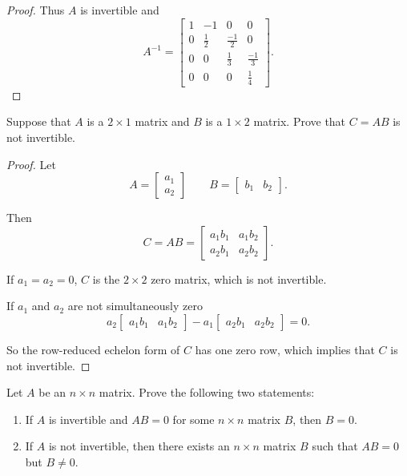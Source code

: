 \begin{proof}
    Thus $A$ is invertible and
    \[
        A^{-1} =
        \begin{bmatrix}
            1 & -1          & 0            & 0            \\
            0 & \frac{1}{2} & \frac{-1}{2} & 0            \\
            0 & 0           & \frac{1}{3}  & \frac{-1}{3} \\
            0 & 0           & 0            & \frac{1}{4}
        \end{bmatrix}.
    \]
\end{proof}

\begin{exercise}
    Suppose that $A$ is a $2\times 1$ matrix and $B$ is a $1\times 2$ matrix. Prove that $C = AB$ is not invertible.
\end{exercise}

\begin{proof}
    Let
    \[
        A = \begin{bmatrix}
            a_{1} \\
            a_{2}
        \end{bmatrix}
        \qquad
        B = \begin{bmatrix}
            b_{1} & b_{2}
        \end{bmatrix}.
    \]

    Then
    \[
        C = AB = \begin{bmatrix}
            a_{1}b_{1} & a_{1}b_{2} \\
            a_{2}b_{1} & a_{2}b_{2}
        \end{bmatrix}.
    \]

    If $a_{1} = a_{2} = 0$, $C$ is the $2\times 2$ zero matrix, which is not invertible.

    If $a_{1}$ and $a_{2}$ are not simultaneously zero
    \[
        a_{2}\begin{bmatrix} a_{1}b_{1} & a_{1}b_{2} \end{bmatrix}
        -
        a_{1}\begin{bmatrix} a_{2}b_{1} & a_{2}b_{2} \end{bmatrix}
        = 0.
    \]

    So the row-reduced echelon form of $C$ has one zero row, which implies that $C$ is not invertible.
\end{proof}

\begin{exercise}
    Let $A$ be an $n\times n$ matrix. Prove the following two statements:
    \begin{enumerate}[label={(\alph*)}]
        \item If $A$ is invertible and $AB = 0$ for some $n\times n$ matrix $B$, then $B = 0$.
        \item If $A$ is not invertible, then there exists an $n\times n$ matrix $B$ such that $AB = 0$ but $B\ne 0$.
    \end{enumerate}
\end{exercise}

